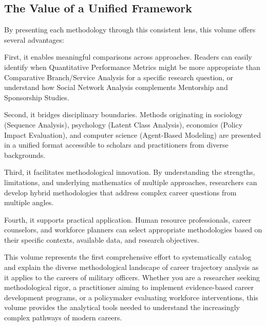 \documentclass[./main.tex]{subfiles}
\begin{document}
\doublespacing

\subsection{The Value of a Unified
Framework}\label{the-value-of-a-unified-framework}

By presenting each methodology through this consistent lens, this volume
offers several advantages:

First, it enables meaningful comparisons across approaches. Readers can
easily identify when Quantitative Performance Metrics might be more
appropriate than Comparative Branch/Service Analysis for a specific
research question, or understand how Social Network Analysis complements
Mentorship and Sponsorship Studies.

Second, it bridges disciplinary boundaries. Methods originating in
sociology (Sequence Analysis), psychology (Latent Class Analysis),
economics (Policy Impact Evaluation), and computer science (Agent-Based
Modeling) are presented in a unified format accessible to scholars and
practitioners from diverse backgrounds.

Third, it facilitates methodological innovation. By understanding the
strengths, limitations, and underlying mathematics of multiple
approaches, researchers can develop hybrid methodologies that address
complex career questions from multiple angles.

Fourth, it supports practical application. Human resource professionals,
career counselors, and workforce planners can select appropriate
methodologies based on their specific contexts, available data, and
research objectives.

This volume represents the first comprehensive effort to systematically
catalog and explain the diverse methodological landscape of career
trajectory analysis as it applies to the careers of military officers.
Whether you are a researcher seeking methodological rigor, a
practitioner aiming to implement evidence-based career development
programs, or a policymaker evaluating workforce interventions, this
volume provides the analytical tools needed to understand the
increasingly complex pathways of modern careers.
\end{document}
